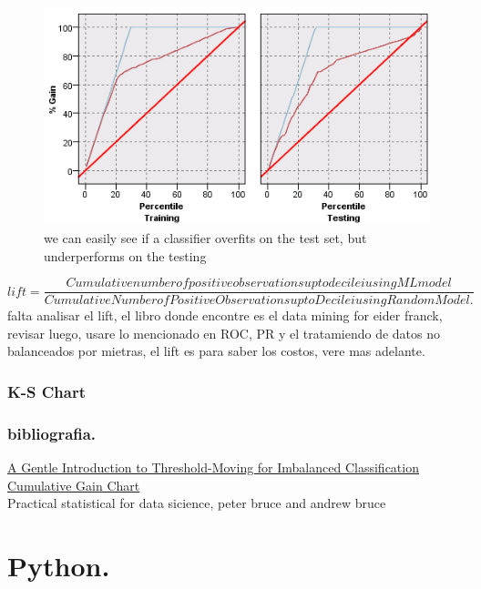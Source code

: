 \documentclass[12pt, a4paper]{book}
\begin{document}
\begin{figure}[H]
	\centering
	\includegraphics[scale=0.5]{gain3.png}
	\caption{we can easily see if a classifier overfits on the test set, but underperforms on the testing}
\end{figure}

\begin{equation}
	lift = \frac{Cumulative number of positive observations upto decile i using ML model}{Cumulative Number of Positive Observations upto Decile i using Random Model.}
\end{equation}
falta analisar el lift, el libro donde encontre es el data mining for eider franck, revisar luego, usare lo mencionado en ROC, PR y el tratamiendo de datos no balanceados por mietras, el lift es para saber los costos, vere mas adelante.

\section{K-S Chart}

\section{bibliografia.}
\href{https://machinelearningmastery.com/threshold-moving-for-imbalanced-classification/}{A Gentle Introduction to Threshold-Moving for Imbalanced Classification}\\
\href{http://mlwiki.org/index.php/Cumulative_Gain_Chart}{Cumulative Gain Chart
}\\
Practical statistical for data sicience, peter bruce and andrew bruce\\



\part{Python.}
\end{document}
